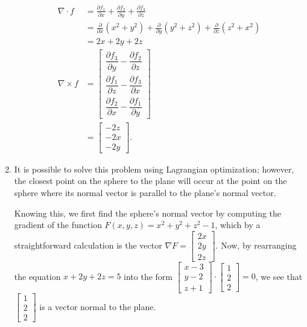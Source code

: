 \documentclass{article}
\begin{document}
\begin{enumerate}
\begin{align*}
 \nabla \cdot f &= \frac{\partial f_1}{\partial x} + \frac{\partial f_2}{\partial y} + \frac{\partial f_3}{\partial z} \\
 &= \frac{\partial}{\partial x}(x^2+y^2) + \frac{\partial}{\partial y}(y^2+z^2) + \frac{\partial}{\partial z}(z^2+x^2) \\
 &= 2x + 2y + 2z \\
 \nabla \times f &= \begin{bmatrix}
  \dfrac{\partial f_3}{\partial y} - \dfrac{\partial f_2}{\partial z} \\
  \dfrac{\partial f_1}{\partial z} - \dfrac{\partial f_3}{\partial x} \\
  \dfrac{\partial f_2}{\partial x} - \dfrac{\partial f_1}{\partial y}
 \end{bmatrix} \\
 &= \begin{bmatrix} - 2z \\ - 2x \\ - 2y \end{bmatrix}.
\end{align*}


\item

It is possible to solve this problem using Lagrangian optimization;
however, the closest point on the sphere to the plane will occur at
the point on the sphere where its normal vector is parallel to the plane's
normal vector.


Knowing this, we first find the sphere's normal vector by computing
the gradient of the function $F(x,y,z) = x^2 + y^2 + z^2 - 1$, which by
a straightforward calculation is the vector
$\nabla F = \begin{bmatrix} 2x \\ 2y \\ 2z \end{bmatrix}$.  Now, by
rearranging the equation $x + 2y + 2z = 5$ into the form
$\begin{bmatrix} x - 3 \\ y -2 \\ z + 1 \end{bmatrix} \cdot
 \begin{bmatrix} 1 \\ 2 \\ 2 \end{bmatrix} = 0$, we see that
$\begin{bmatrix} 1 \\ 2 \\ 2 \end{bmatrix}$ is a vector normal to the plane.


\end{enumerate}
\end{document}
